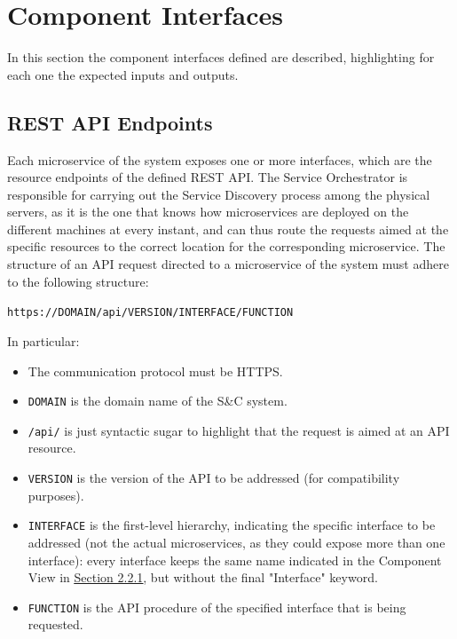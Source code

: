 \newpage

\section{Component Interfaces}
\label{sec: component_interfaces}
In this section the component interfaces defined are described, highlighting for each one the expected inputs and outputs.

\subsection{REST API Endpoints}
Each microservice of the system exposes one or more interfaces, which are the resource endpoints of the defined REST API. The Service Orchestrator is responsible for carrying out the Service Discovery process among the physical servers, as it is the one that knows how microservices are deployed on the different machines at every instant, and can thus route the requests aimed at the specific resources to the correct location for the corresponding microservice.
The structure of an API request directed to a microservice of the system must adhere to the following structure:

\texttt{https://DOMAIN/api/VERSION/INTERFACE/FUNCTION}

In particular:
\begin{itemize}
    \item The communication protocol must be HTTPS.
    \item \texttt{DOMAIN} is the domain name of the S\&C system.
    \item \texttt{/api/} is just syntactic sugar to highlight that the request is aimed at an API resource.
    \item \texttt{VERSION} is the version of the API to be addressed (for compatibility purposes).
    \item \texttt{INTERFACE} is the first-level hierarchy, indicating the specific interface to be addressed (not the actual microservices, as they could expose more than one interface): every interface keeps the same name indicated in the Component View in \hyperref[fig:component_diagram]{\protect\uline{Section 2.2.1}}, but without the final "Interface" keyword.
    \item \texttt{FUNCTION} is the API procedure of the specified interface that is being requested.
\end{itemize}


